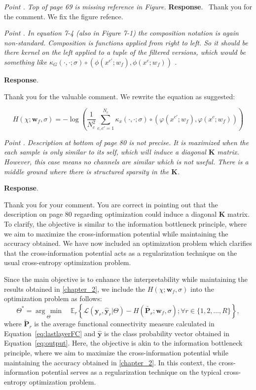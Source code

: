 \documentclass[runningheads]{llncs}
\providecommand{\promeddd}[2]{\mathbb{E}_{#1}\!\left\{#2\right\}}%
\newcommand{\ve}[1]{\bm {#1}}
\newcommand{\mat}[1]{\bm {#1}}
\newenvironment{reviewer}{\setcounter{pointcounter}{1}}{}
\newcommand{\changes}[1]{\textcolor[rgb]{1.00,0.00,0.00}{#1}}
\newcommand{\point}[1]{\medskip \noindent
 \textsl{{\fontseries{b}\selectfont Point \thepointcounter}.
 \stepcounter{pointcounter} #1}}
\newcommand{\reply}{\medskip \noindent \textbf{Response}.\ }
\begin{document}
\begin{reviewer}
\point{Top of page 69 is missing reference in Figure.}
\reply{
    Thank you for the comment. We fix the figure refence.
}

\point{In equation 7-4 (also in Figure 7-1) the composition notation is again non-standard. Composition is functions applied from right to left. So it should be there kernel on the left applied to a tuple of the filtered versions, which would be something like $\kappa_G(\cdot,\cdot;\sigma) \circ\left (\phi(x^{c'};w_f), \phi(x^{c};w_f)\right )$ .}

\reply{
    Thank you for the valuable comment. We rewrite the equation as suggested:

    \changes{
        \begin{equation}
          H(\chi; \mathbf{w}_f, \sigma) = - \log \left( \frac{1}{N_c^2} \sum_{c,c'=1}^{N_c} \kappa_{x}(\cdot, \cdot;\sigma) \circ\left (\varphi(x^{c'};w_f), \varphi(x^{c};w_f)\right ) \right) 
        \end{equation}
        }
}

\point{Description at bottom of page 80 is not  precise. It is maximized when the each sample is only similar to its self, which will induce a diagonal $\mathbf{K}$ matrix.  However, this case means no channels are similar which is not useful. There is a middle ground where there is structured sparsity in the $\mathbf{K}$.}

\reply{
    Thank you for your comment. You are correct in pointing out that the description on page 80 regarding optimization could induce a diagonal $\mathbf{K}$ matrix. To clarify, the objective is similar to the information bottleneck principle, where we aim to maximize the cross-information potential while maintaining the accuracy obtained. We have now included an optimization problem which clarifies that the cross-information potential acts as a regularization technique on the usual cross-entropy optimization problem.

    \changes{Since the main objective is to enhance the interpretability while maintaining the results obtained in \cref{chapter_2}, we include the $H(\chi; \mathbf{w}_f, \sigma)$ into the optimization problem as follows: 
    \begin{equation}
      \Theta^{*} = \underset{\Theta}{\arg\,\min} \quad \promeddd{r}{\mathcal{L}(\ve{y}_r,\hat{\ve{y}}_r|\Theta) - H(\tilde{\mat{P}_r}; \mathbf{w}_f, \sigma); \forall r\in\{1,2,\dots,R\}},
    \end{equation}
    where $\tilde{\mat{P}}_r$ is the average functional connectivity measure calculated in Equation~\eqref{eq:lastlayerFC} and $\hat{\ve{y}}$ is the class probability vector obtained in Equation~\eqref{eq:output}. Here, the objective is akin to the information bottleneck principle, where we aim to maximize the cross-information potential while maintaining the accuracy obtained in \cref{chapter_2}. In this context, the cross-information potential serves as a regularization technique on the typical cross-entropy optimization problem.
    }
}


\end{reviewer}
\end{document}
